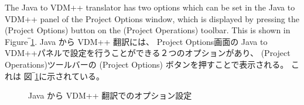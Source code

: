 \documentclass[\pformat,12pt]{jarticle}
\newcommand{\guicmd}[1]{{\sf #1}}
\begin{document}
The Java to VDM++ translator has two options which can be set in the 
\guicmd{Java to VDM++} panel of the \guicmd{Project Options} window, 
which is displayed by pressing the
(\guicmd{Project Options}) button on the (\guicmd{Project Operations})
toolbar. This is shown in Figure‾\ref{fig:j2voptions}.
Java から VDM++ 翻訳には、 \guicmd{Project Options}画面の \guicmd{Java to VDM++}パネルで設定を行うことができる２つのオプションがあり、 (\guicmd{Project Operations})ツールバーの (\guicmd{Project Options}) ボタンを押すことで表示される。
これは 図‾\ref{fig:j2voptions}に示されている。

\begin{figure}[tbh]
\begin{center}
\caption{Java から VDM++ 翻訳でのオプション設定\label{fig:j2voptions}}
\end{center}
\end{figure}
\end{document}
